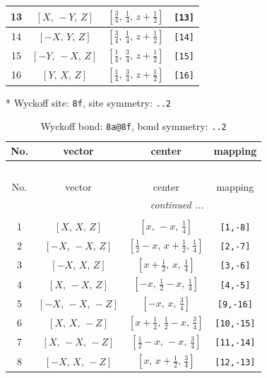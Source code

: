 \documentclass[fleqn,8pt]{jsarticle}
\begin{document}
\begin{longtable}{cccc}
13 & $\left[ X,\, - Y,\, Z \right]$ & $\left[ \frac{3}{4},\, \frac{1}{4},\, z + \frac{1}{2} \right]$ & {\tt [13]} \\ \hline
14 & $\left[ - X,\, Y,\, Z \right]$ & $\left[ \frac{3}{4},\, \frac{1}{4},\, z + \frac{1}{2} \right]$ & {\tt [14]} \\ \hline
15 & $\left[ - Y,\, - X,\, Z \right]$ & $\left[ \frac{1}{4},\, \frac{3}{4},\, z + \frac{1}{2} \right]$ & {\tt [15]} \\ \hline
16 & $\left[ Y,\, X,\, Z \right]$ & $\left[ \frac{1}{4},\, \frac{3}{4},\, z + \frac{1}{2} \right]$ & {\tt [16]} \\
\end{longtable}
* Wyckoff site: {\tt 8f}, site symmetry: {\tt ..2}
\renewcommand{\arraystretch}{1.2}
\begin{longtable}{cccc}
\caption{Wyckoff bond: {\tt 8a@8f}, bond symmetry: {\tt ..2}}
 \\
 \hline \hline
No. & vector & center & mapping \\ \hline \endfirsthead

\multicolumn{3}{l}{\tablename\ \thetable{}} \\
 \hline \hline
No. & vector & center & mapping \\ \hline \endhead

 \hline \hline
\multicolumn{3}{r}{\footnotesize\it continued ...} \\ \endfoot

 \hline \hline
\multicolumn{3}{r}{} \\ \endlastfoot

1 & $\left[ X,\, X,\, Z \right]$ & $\left[ x,\, - x,\, \frac{1}{4} \right]$ & {\tt [1,-8]} \\ \hline
2 & $\left[ - X,\, - X,\, Z \right]$ & $\left[ \frac{1}{2} - x,\, x + \frac{1}{2},\, \frac{1}{4} \right]$ & {\tt [2,-7]} \\ \hline
3 & $\left[ - X,\, X,\, Z \right]$ & $\left[ x + \frac{1}{2},\, x,\, \frac{1}{4} \right]$ & {\tt [3,-6]} \\ \hline
4 & $\left[ X,\, - X,\, Z \right]$ & $\left[ - x,\, \frac{1}{2} - x,\, \frac{1}{4} \right]$ & {\tt [4,-5]} \\ \hline
5 & $\left[ - X,\, - X,\, - Z \right]$ & $\left[ - x,\, x,\, \frac{3}{4} \right]$ & {\tt [9,-16]} \\ \hline
6 & $\left[ X,\, X,\, - Z \right]$ & $\left[ x + \frac{1}{2},\, \frac{1}{2} - x,\, \frac{3}{4} \right]$ & {\tt [10,-15]} \\ \hline
7 & $\left[ X,\, - X,\, - Z \right]$ & $\left[ \frac{1}{2} - x,\, - x,\, \frac{3}{4} \right]$ & {\tt [11,-14]} \\ \hline
8 & $\left[ - X,\, X,\, - Z \right]$ & $\left[ x,\, x + \frac{1}{2},\, \frac{3}{4} \right]$ & {\tt [12,-13]} \\
\end{longtable}
\end{document}
